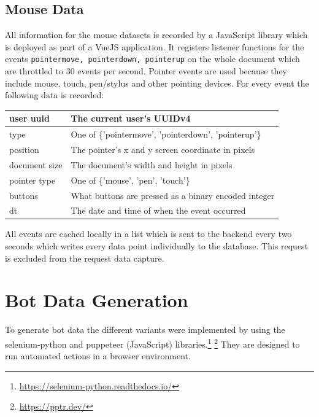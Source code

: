 \documentclass[
    fontsize=12pt,
    headings=small,
    parskip=half,           %
    bibliography=totoc,
    numbers=noenddot,       %
    open=any,               %
    final                   %
]{scrreprt}
\begin{document}
\subsection{Mouse Data}

All information for the mouse datasets is recorded by a JavaScript library which is deployed as part of a VueJS application. It registers listener functions for the events \lstinline{pointermove, pointerdown, pointerup} on the whole document which are throttled to $30$ events per second. Pointer events are used because they include mouse, touch, pen/stylus and other pointing devices. For every event the following data is recorded:

\begin{table}[]
\begin{tabular}{|l|l|}
\hline
user uuid & The current user's UUIDv4 \\ \hline
type & One of \{'pointermove', 'pointerdown', 'pointerup'\} \\ \hline
position & The pointer's x and y screen coordinate in pixels \\ \hline
document size & The document's width and height in pixels \\ \hline
pointer type & One of \{'mouse', 'pen', 'touch'\} \\ \hline
buttons & What buttons are pressed as a binary encoded integer \\ \hline
dt & The date and time of when the event occurred \\ \hline

\end{tabular}
\end{table}

All events are cached locally in a list which is sent to the backend every two seconds which writes every data point individually to the database. This request is excluded from the request data capture.

\section{Bot Data Generation}

To generate bot data the different variants were implemented by using the selenium-python and puppeteer (JavaScript) libraries.\footnote{\url{https://selenium-python.readthedocs.io/}} \footnote{\url{https://pptr.dev/}} They are designed to run automated actions in a browser environment.
\end{document}
